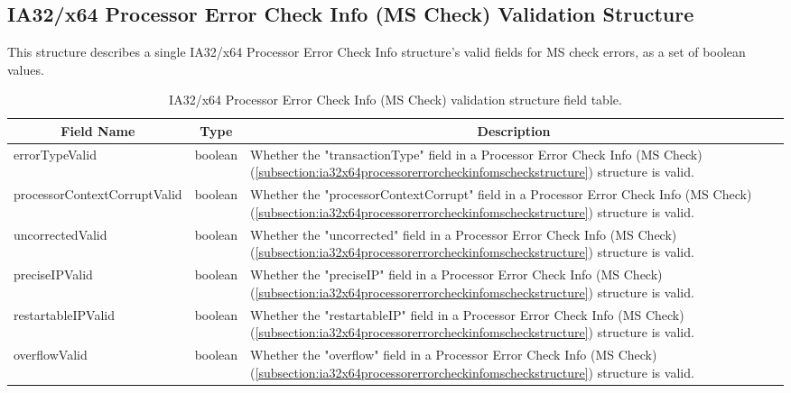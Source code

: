 \documentclass{report}
\newcommand*{\thead}[1]{\multicolumn{1}{|c|}{\bfseries #1}}
\newcommand*{\jsontable}[1]{
    \begin{table}[!ht]
    \label{#1}
    \centering
    \begin{adjustbox}{center}
    \begin{tabular}{|l|c|p{8cm}|}
    \hline
    \thead{Field Name} & \thead{Type} & \thead{Description} \\
    \hline
}
\newcommand*{\jsontableend}[1]{
    \hline
    \end{tabular}
    \end{adjustbox}
    \caption{#1}
    \label{table:#1}
    \end{table}
    \FloatBarrier
}
\begin{document}
\subsection{IA32/x64 Processor Error Check Info (MS Check) Validation Structure}
\label{subsection:ia32x64processorerrorcheckinfomscheckvalidationstructure}
This structure describes a single IA32/x64 Processor Error Check Info structure's valid fields for MS check errors, as a set of boolean values.
\jsontable{table:ia32x64processorerrorcheckinfomscheckvalidationstructure}
errorTypeValid & boolean & Whether the "transactionType" field in a Processor Error Check Info (MS Check) (\ref{subsection:ia32x64processorerrorcheckinfomscheckstructure}) structure is valid.\\
\hline
processorContextCorruptValid & boolean & Whether the "processorContextCorrupt" field in a Processor Error Check Info (MS Check) (\ref{subsection:ia32x64processorerrorcheckinfomscheckstructure}) structure is valid.\\
\hline
uncorrectedValid & boolean & Whether the "uncorrected" field in a Processor Error Check Info (MS Check) (\ref{subsection:ia32x64processorerrorcheckinfomscheckstructure}) structure is valid.\\
\hline
preciseIPValid & boolean & Whether the "preciseIP" field in a Processor Error Check Info (MS Check) (\ref{subsection:ia32x64processorerrorcheckinfomscheckstructure}) structure is valid.\\
\hline
restartableIPValid & boolean & Whether the "restartableIP" field in a Processor Error Check Info (MS Check) (\ref{subsection:ia32x64processorerrorcheckinfomscheckstructure}) structure is valid.\\
\hline
overflowValid & boolean & Whether the "overflow" field in a Processor Error Check Info (MS Check) (\ref{subsection:ia32x64processorerrorcheckinfomscheckstructure}) structure is valid.\\
\jsontableend{IA32/x64 Processor Error Check Info (MS Check) validation structure field table.}

\end{document}
